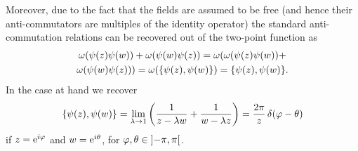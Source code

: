  Moreover, due to the fact that the fields are assumed to be 
 free (and hence their anti-commutators are multiples of the 
 identity operator) the standard anti-commutation relations 
 can be recovered out of the two-point function as 
 \begin{multline*}
 \omega(\psi(z)\psi(w))+\omega(\psi(w)\psi(z))=
 \omega(\omega(\psi(z)\psi(w))+\\ 
 \omega(\psi(w)\psi(z)))=
 \omega(\{\psi(z),\psi(w)\})=\{\psi(z),\psi(w)\}.
 \end{multline*}
 In the case at hand we recover
 \[
 \{\psi(z),\psi(w)\}=\lim_{\lambda\to 1}
 \left(\frac{1}{z-\lambda w} +\frac{1}{w-\lambda z} \right)=
 \frac{2\pi}{z}\,\delta(\varphi-\theta)
 \]
 if $z=\operatorname{e}^{i\varphi}$ and $w=\operatorname{e}^{i\theta}$, for
 $\varphi,\theta\in\mathopen{]}-\pi,\pi\mathclose{[}$.
 







